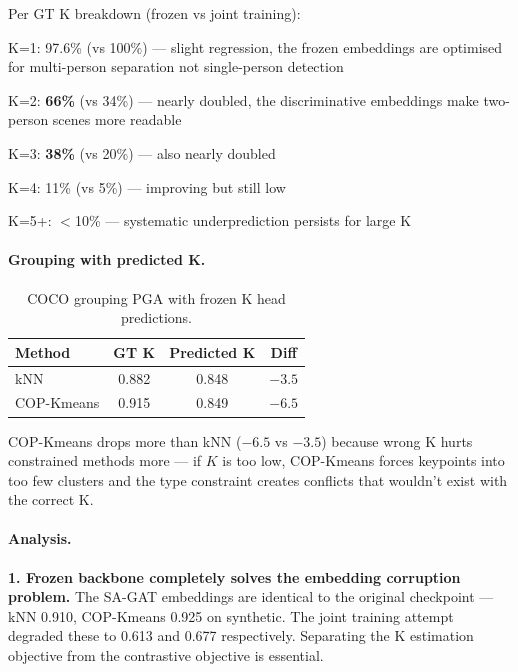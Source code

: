 Per GT K breakdown (frozen vs joint training):
\begin{compactitem}
  \item K=1: 97.6\% (vs 100\%) --- slight regression, the frozen embeddings are optimised for multi-person separation not single-person detection
  \item K=2: \textbf{66\%} (vs 34\%) --- nearly doubled, the discriminative embeddings make two-person scenes more readable
  \item K=3: \textbf{38\%} (vs 20\%) --- also nearly doubled
  \item K=4: 11\% (vs 5\%) --- improving but still low
  \item K=5+: $<$10\% --- systematic underprediction persists for large K
\end{compactitem}

\paragraph{Grouping with predicted K.}

\begin{table}[H]
\centering
\footnotesize
\begin{tabular}{lccc}
\toprule
Method & GT K & Predicted K & Diff \\
\midrule
kNN & 0.882 & 0.848 & $-3.5$ \\
COP-Kmeans & 0.915 & 0.849 & $-6.5$ \\
\bottomrule
\end{tabular}
\caption{COCO grouping PGA with frozen K head predictions.}
\end{table}

COP-Kmeans drops more than kNN ($-6.5$ vs $-3.5$) because wrong K hurts constrained methods more --- if $K$ is too low, COP-Kmeans forces keypoints into too few clusters and the type constraint creates conflicts that wouldn't exist with the correct K.


\paragraph{Analysis.}

\textbf{1. Frozen backbone completely solves the embedding corruption problem.} The SA-GAT embeddings are identical to the original checkpoint --- kNN 0.910, COP-Kmeans 0.925 on synthetic. The joint training attempt degraded these to 0.613 and 0.677 respectively. Separating the K estimation objective from the contrastive objective is essential.

